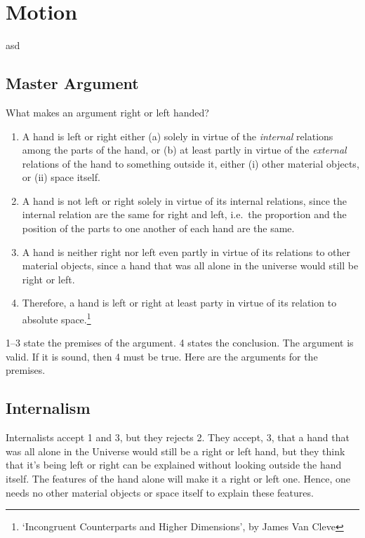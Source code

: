 \documentclass[oneside]{article}
\begin{document}
\thispagestyle{fancy}




\section{Motion}\label{motion}

asd

\subsection{Master Argument}\label{master-argument}

What makes an argument right or left handed?

\begin{enumerate}
\def\labelenumi{\arabic{enumi}.}
\item
  A hand is left or right either (a) solely in virtue of the
  \emph{internal} relations among the parts of the hand, or (b) at least
  partly in virtue of the \emph{external} relations of the hand to
  something outside it, either (i) other material objects, or (ii) space
  itself.
\item
  A hand is not left or right solely in virtue of its internal
  relations, since the internal relation are the same for right and
  left, i.e.~the proportion and the position of the parts to one another
  of each hand are the same.
\item
  A hand is neither right nor left even partly in virtue of its
  relations to other material objects, since a hand that was all alone
  in the universe would still be right or left.
\item
  Therefore, a hand is left or right at least party in virtue of its
  relation to absolute space.\footnote{`Incongruent Counterparts and
    Higher Dimensions', by James Van Cleve}
\end{enumerate}

1--3 state the premises of the argument. 4 states the conclusion. The
argument is valid. If it is sound, then 4 must be true. Here are the
arguments for the premises.

\subsection{Internalism}\label{internalism}

Internalists accept 1 and 3, but they rejects 2. They accept, 3, that a
hand that was all alone in the Universe would still be a right or left
hand, but they think that it's being left or right can be explained
without looking outside the hand itself. The features of the hand alone
will make it a right or left one. Hence, one needs no other material
objects or space itself to explain these features.
\end{document}
